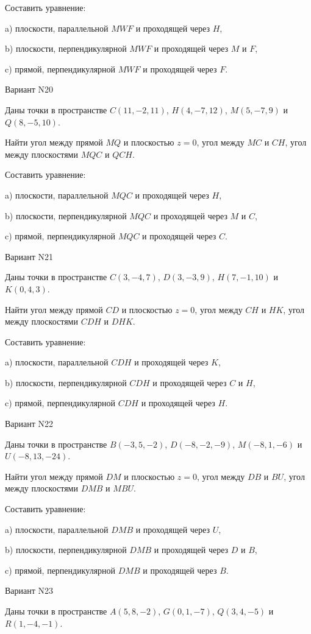 \documentclass[11pt]{report}
\begin{document}
Составить уравнение: 

a) плоскости, параллельной $MWF$ и проходящей через $H$,

b) плоскости, перпендикулярной $MWF$ и проходящей через $M$ и $F$,

c) прямой, перпендикулярной $MWF$ и проходящей через $F$.

Вариант N20

Даны точки в пространстве
$C(11, -2, 11)$, $H(4, -7, 12)$, $M(5, -7, 9)$ и
$Q(8, -5, 10)$.

Найти угол между прямой $MQ$ и плоскостью $z = 0$, угол между $MC$ и $CH$, угол между плоскостями $MQC$ 
и $QCH$.

Составить уравнение: 

a) плоскости, параллельной $MQC$ и проходящей через $H$,

b) плоскости, перпендикулярной $MQC$ и проходящей через $M$ и $C$,

c) прямой, перпендикулярной $MQC$ и проходящей через $C$.

Вариант N21

Даны точки в пространстве
$C(3, -4, 7)$, $D(3, -3, 9)$, $H(7, -1, 10)$ и
$K(0, 4, 3)$.

Найти угол между прямой $CD$ и плоскостью $z = 0$, угол между $CH$ и $HK$, угол между плоскостями $CDH$ 
и $DHK$.

Составить уравнение: 

a) плоскости, параллельной $CDH$ и проходящей через $K$,

b) плоскости, перпендикулярной $CDH$ и проходящей через $C$ и $H$,

c) прямой, перпендикулярной $CDH$ и проходящей через $H$.

Вариант N22

Даны точки в пространстве
$B(-3, 5, -2)$, $D(-8, -2, -9)$, $M(-8, 1, -6)$ и
$U(-8, 13, -24)$.

Найти угол между прямой $DM$ и плоскостью $z = 0$, угол между $DB$ и $BU$, угол между плоскостями $DMB$ 
и $MBU$.

Составить уравнение: 

a) плоскости, параллельной $DMB$ и проходящей через $U$,

b) плоскости, перпендикулярной $DMB$ и проходящей через $D$ и $B$,

c) прямой, перпендикулярной $DMB$ и проходящей через $B$.

Вариант N23

Даны точки в пространстве
$A(5, 8, -2)$, $G(0, 1, -7)$, $Q(3, 4, -5)$ и
$R(1, -4, -1)$.
\end{document}
